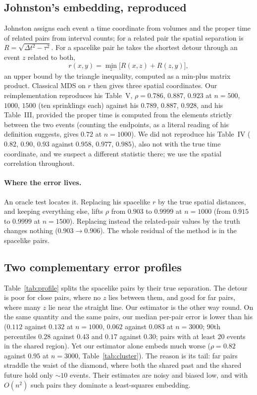 \documentclass[11pt,a4paper]{article}
\begin{document}
\subsection{Johnston's embedding, reproduced}
Johnston assigns each event a time coordinate from volumes and the proper time of related pairs from interval counts; for a related pair the spatial separation is $R=\sqrt{\Delta t^2-\tau^2}$. For a spacelike pair he takes the shortest detour through an event $z$ related to both,
\begin{equation}
r(x,y)=\min_z\big[R(x,z)+R(z,y)\big],
\end{equation}
an upper bound by the triangle inequality, computed as a min-plus matrix product. Classical MDS on $r$ then gives three spatial coordinates. Our reimplementation reproduces his Table~V, $\rho=0.786$, $0.887$, $0.923$ at $n=500$, $1000$, $1500$ (ten sprinklings each) against his $0.789$, $0.887$, $0.928$, and his Table~III, provided the proper time is computed from the elements strictly between the two events (counting the endpoints, as a literal reading of his definition suggests, gives $0.72$ at $n=1000$). We did not reproduce his Table~IV ($0.82$, $0.90$, $0.93$ against $0.958$, $0.977$, $0.985$), also not with the true time coordinate, and we suspect a different statistic there; we use the spatial correlation throughout.

\paragraph{Where the error lives.} An oracle test locates it. Replacing his spacelike $r$ by the true spatial distances, and keeping everything else, lifts $\rho$ from $0.903$ to $0.9999$ at $n=1000$ (from $0.915$ to $0.9999$ at $n=1500$). Replacing instead the related-pair values by the truth changes nothing ($0.903\to0.906$). The whole residual of the method is in the spacelike pairs.

\subsection{Two complementary error profiles}
Table~\ref{tab:profile} splits the spacelike pairs by their true separation. The detour is poor for close pairs, where no $z$ lies between them, and good for far pairs, where many $z$ lie near the straight line. Our estimator is the other way round. On the same quantity and the same pairs, our median per-pair error is lower than his ($0.112$ against $0.132$ at $n=1000$, $0.062$ against $0.083$ at $n=3000$; 90th percentiles $0.28$ against $0.43$ and $0.17$ against $0.30$; pairs with at least 20 events in the shared region). Yet our estimator alone embeds much worse ($\rho=0.82$ against $0.95$ at $n=3000$, Table~\ref{tab:cluster}). The reason is its tail: far pairs straddle the waist of the diamond, where both the shared past and the shared future hold only $\sim10$ events. Their estimates are noisy and biased low, and with $O(n^2)$ such pairs they dominate a least-squares embedding.
\end{document}
